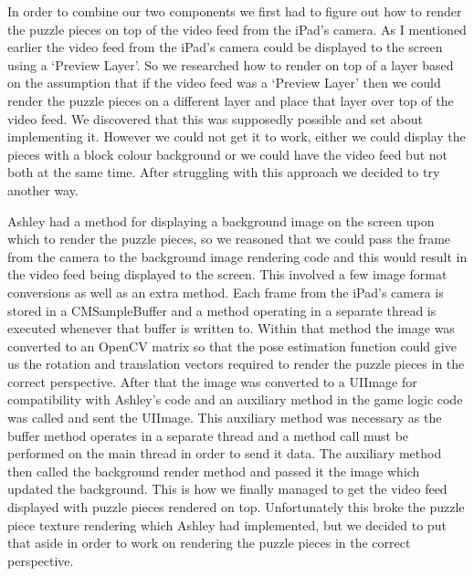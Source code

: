 \documentclass{article}
\begin{document}
In order to combine our two components we first had to figure out how to render the puzzle pieces on top of the video feed from the iPad's camera. As I mentioned earlier the video feed from the iPad's camera could be displayed to the screen using a `Preview Layer'. So we researched how to render on top of a layer based on the assumption that if the video feed was a `Preview Layer' then we could render the puzzle pieces on a different layer and place that layer over top of the video feed. We discovered that this was supposedly possible and set about implementing it. However we could not get it to work, either we could display the pieces with a block colour background or we could have the video feed but not both at the same time. After struggling with this approach we decided to try another way.

Ashley had a method for displaying a background image on the screen upon which to render the puzzle pieces, so we reasoned that we could pass the frame from the camera to the background image rendering code and this would result in the video feed being displayed to the screen. This involved a few image format conversions as well as an extra method.
Each frame from the iPad's camera is stored in a CMSampleBuffer and a method operating in a separate thread is executed whenever that buffer is written to. Within that method the image was converted to an OpenCV matrix so that the pose estimation function could give us the rotation and translation vectors required to render the puzzle pieces in the correct perspective. After that the image was converted to a UIImage for compatibility with Ashley's code and an auxiliary method in the game logic code was called and sent the UIImage. This auxiliary method was necessary as the buffer method operates in a separate thread and a method call must be performed on the main thread in order to send it data. The auxiliary method then called the background render method and passed it the image which updated the background. This is how we finally managed to get the video feed displayed with puzzle pieces rendered on top. Unfortunately this broke the puzzle piece texture rendering which Ashley had implemented, but we decided to put that aside in order to work on rendering the puzzle pieces in the correct perspective.
\end{document}
